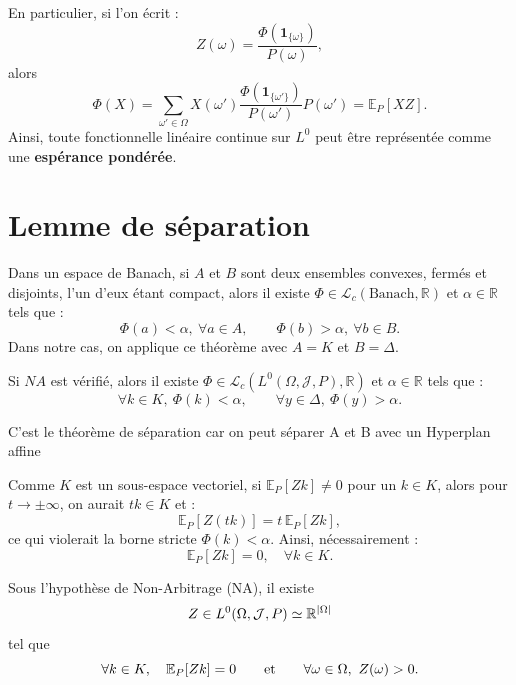 En particulier, si l'on écrit :
\[
Z(\omega) = \frac{\Phi(\mathbf{1}_{\{\omega\}})}{P(\omega)},
\]
alors
\[
\Phi(X) = \sum_{\omega' \in \Omega} X(\omega') \frac{\Phi(\mathbf{1}_{\{\omega'\}})}{P(\omega')} P(\omega')
= \mathbb{E}_P[X Z].
\]
Ainsi, toute fonctionnelle linéaire continue sur $L^0$ peut être représentée comme une \textbf{espérance pondérée}.


\section{Lemme de séparation}

\begin{theoreme}
Dans un espace de Banach, si $A$ et $B$ sont deux ensembles convexes, fermés et disjoints, l'un d'eux étant compact,  
alors il existe $\Phi \in \mathcal{L}_c(\text{Banach}, \mathbb{R})$ et $\alpha \in \mathbb{R}$ tels que :
\[
\Phi(a) < \alpha,\ \forall a \in A, \qquad \Phi(b) > \alpha,\ \forall b \in B.
\]
Dans notre cas, on applique ce théorème avec $A = K$ et $B = \Delta$.
\end{theoreme}

\begin{lemme} \label{lem:6}
Si $NA$ est vérifié, alors il existe $\Phi \in \mathcal{L}_c(L^0(\Omega, \mathcal{J}, P), \mathbb{R})$ et $\alpha \in \mathbb{R}$ tels que :
\begin{equation}
\forall k \in K,\ \Phi(k) < \alpha, \qquad \forall y \in \Delta,\ \Phi(y) > \alpha.
\end{equation}
\end{lemme}

\begin{remarque}
\item C'est le théorème de séparation car on peut séparer A et B avec un Hyperplan affine
\item Comme $K$ est un sous-espace vectoriel, si $\mathbb{E}_P[Zk] \neq 0$ pour un $k \in K$,  
alors pour $t \to \pm\infty$, on aurait $tk \in K$ et :
\[
\mathbb{E}_P[Z(tk)] = t \, \mathbb{E}_P[Zk],
\]
ce qui violerait la borne stricte $\Phi(k) < \alpha$.  
Ainsi, nécessairement :
\[
\mathbb{E}_P[Zk] = 0,\quad \forall k \in K.
\]
\end{remarque}


\begin{lemme}\label{lem:7}
Sous l'hypothèse de Non-Arbitrage (NA), il existe
\[
 Z\in L^0(\Omega,\mathcal{J},P)\simeq \mathbb{R}^{|\Omega|}
\]
tel que
\begin{equation}
\forall k\in K,\quad \mathbb{E}_P[Zk]=0
\qquad\text{et}\qquad
\forall \omega\in\Omega,\ Z(\omega)>0 .
\end{equation}
\end{lemme}

